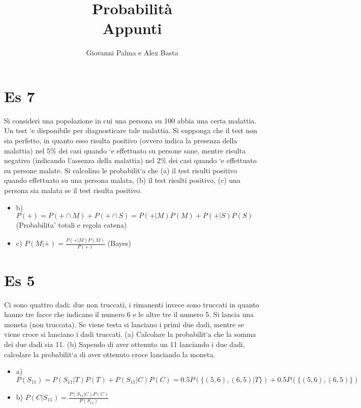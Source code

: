\documentclass{report}
\title{\Huge{Probabilità}\\Appunti}
\author{\huge{Giovanni Palma e Alex Basta}}
\date{}
\begin{document}
\maketitle
\newpage%




\tableofcontents

\pagebreak
\section{Es 7}
Si consideri una popolazione in cui una persona su 100 abbia una certa malattia. Un test
`e disponibile per diagnosticare tale malattia. Si supponga che il test non sia perfetto, in quanto esso
risulta positivo (ovvero indica la presenza della malattia) nel 5\% dei casi quando `e effettuato su persone
sane, mentre risulta negativo (indicando l’assenza della malattia) nel 2\% dei casi quando `e effettuato su
persone malate. Si calcolino le probabilit`a che
(a) il test risulti positivo quando effettuato su una persona malata,
(b) il test risulti positivo,
(c) una persona sia malata se il test risulta positivo.

\begin{itemize}
  \item b) $ P(+) = P(+ \cap M) + P(+ \cap S) = P(+|M)P(M) + P(+|S)P(S) $ (Probabilita' totali e regola catena)
  \item c) $ P(M|+) = \frac{P(+|M)P(M)}{P(+)} $ (Bayes)
\end{itemize}

\section{Es 5}
Ci sono quattro dadi: due non truccati, i rimanenti invece sono truccati in quanto hanno
tre facce che indicano il numero 6 e le altre tre il numero 5. Si lancia una moneta (non truccata). Se
viene testa si lanciano i primi due dadi, mentre se viene croce si lanciano i dadi truccati.
(a) Calcolare la probabilit`a che la somma dei due dadi sia 11.
(b) Sapendo di aver ottenuto un 11 lanciando i due dadi, calcolare la probabilit`a di aver ottenuto croce
lanciando la moneta.

\begin{itemize}
  \item a) $ P(S_{11}) = P(S_{11}|T)P(T) + P(S_{11}|C)P(C) = 0.5P(\{(5,6), (6,5)|T\}) + 0.5P(\{(5,6), (6,5)\}) $ 
  \item b) $ P(C|S_{11}) = \frac{P(S_{11}|C)P(C)}{P(S_{11})} $
\end{itemize}
\end{document}
